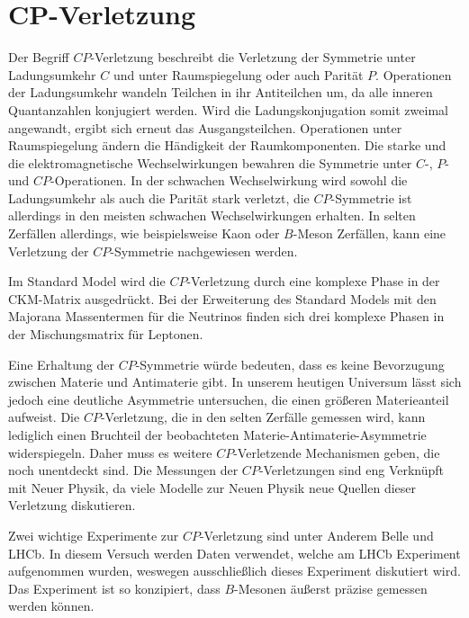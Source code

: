 \section{CP-Verletzung}

Der Begriff $CP$-Verletzung beschreibt die Verletzung der Symmetrie unter Ladungsumkehr $C$ und unter
Raumspiegelung oder auch Parität $P$. Operationen der Ladungsumkehr wandeln Teilchen in ihr
Antiteilchen um, da alle inneren Quantanzahlen konjugiert werden. Wird die Ladungskonjugation somit
zweimal angewandt, ergibt sich erneut das Ausgangsteilchen. Operationen unter Raumspiegelung ändern
die Händigkeit der Raumkomponenten. Die starke und die elektromagnetische Wechselwirkungen bewahren
die Symmetrie unter $C$-, $P$- und $CP$-Operationen. In der schwachen Wechselwirkung wird sowohl die
Ladungsumkehr als auch die Parität stark verletzt, die $CP$-Symmetrie ist allerdings in den meisten
schwachen Wechselwirkungen erhalten. In selten Zerfällen allerdings, wie beispielsweise Kaon
oder $B$-Meson Zerfällen, kann eine Verletzung der $CP$-Symmetrie nachgewiesen werden.  \par

Im Standard Model wird die $CP$-Verletzung durch eine komplexe Phase in der CKM-Matrix
ausgedrückt. Bei der Erweiterung des Standard Models mit den Majorana Massentermen für die
Neutrinos finden sich drei komplexe Phasen in der Mischungsmatrix für Leptonen. \par

Eine Erhaltung der $CP$-Symmetrie würde bedeuten, dass es keine Bevorzugung zwischen Materie und
Antimaterie gibt. In unserem heutigen Universum lässt sich jedoch eine deutliche Asymmetrie
untersuchen, die einen größeren Materieanteil aufweist.
Die $CP$-Verletzung, die in den selten Zerfälle gemessen wird, kann lediglich einen Bruchteil der beobachteten Materie-Antimaterie-Asymmetrie widerspiegeln.
Daher muss es weitere $CP$-Verletzende Mechanismen geben, die noch unentdeckt sind. Die
Messungen der $CP$-Verletzungen sind eng Verknüpft mit Neuer Physik, da viele Modelle zur Neuen
Physik neue Quellen dieser Verletzung diskutieren. \par

Zwei wichtige Experimente zur $CP$-Verletzung sind unter Anderem Belle und LHCb. In diesem
Versuch werden Daten verwendet, welche am LHCb Experiment aufgenommen wurden, weswegen
ausschließlich dieses Experiment diskutiert wird. Das Experiment ist so konzipiert, dass
$B$-Mesonen äußerst präzise gemessen werden können. \par

